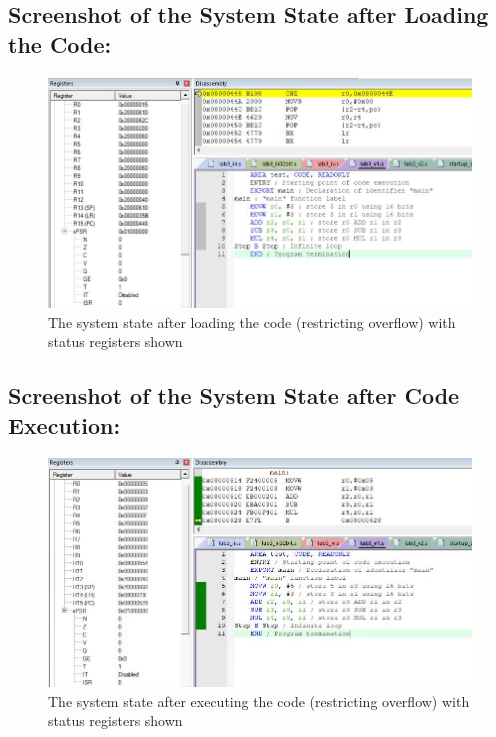 \documentclass[12pt]{article}
\begin{document}
\subsection{Screenshot of the System State after Loading the Code:}
\begin{figure}[ht]
    \centering
    \includegraphics[scale=.7]{images/lab3_3_ss1.jpg}
    \caption{The system state after loading the code (restricting overflow) with status registers shown}
    \label{fig:before_task_five_one}
\end{figure}
\pagebreak
\subsection{Screenshot of the System State after Code Execution:}
\begin{figure}[ht]
    \centering
    \includegraphics[scale=.7]{images/lab3_3_ss2.jpg}
    \caption{The system state after executing the code (restricting overflow) with status registers shown}
    \label{fig:after_task_five_one}
\end{figure}
\pagebreak
\end{document}
